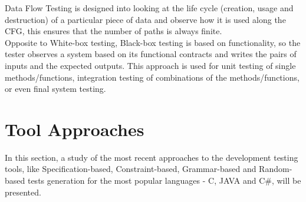 Data Flow Testing is designed into looking at the life cycle
(creation, usage and destruction) of a particular
piece of data and observe how it is used along the \ac{CFG}, this ensures
that the number of paths is always finite\cite{dataflow}.\\

Opposite to White-box testing, Black-box testing is based on
functionality, so the tester observes a system based
on its functional contracts and writes the pairs of inputs and the
expected outputs.
This approach is used for unit testing of single methods/functions,
integration testing
of combinations of the methods/functions, or even final system testing.\\


\section{Tool Approaches}\label{testingapproaches}
In this section, a study of the most recent approaches to the development testing tools,
like Specification-based, Constraint-based, Grammar-based and Random-based tests generation
for the most popular languages - C, JAVA and C\#, will be presented.

